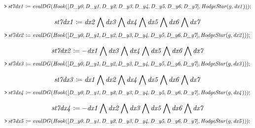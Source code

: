 \documentclass{article}
\begin{document}
\mapleinput
{$ \displaystyle \texttt{>\,} \mathit{st7dx1} \coloneqq \mathit{evalDG} (\mathit{Hook} ([\textit{D\_y0} ,\textit{D\_y1} ,\textit{D\_y2} ,\textit{D\_y3} ,\textit{D\_y4} ,\textit{D\_y5} ,\textit{D\_y6} ,\textit{D\_y7}],\mathit{HodgeStar} (g ,\mathit{dx1}))); $}

\begin{dmath}\label{(25)}
\mathit{st7dx1} \coloneqq 
\\
\mathit{dx2} \bigwedge  \mathit{dx3}  \bigwedge  \mathit{dx4}  \bigwedge  \mathit{dx5}  
\\
\bigwedge  \mathit{dx6} 
\\
 \bigwedge  \mathit{dx7} 
\end{dmath}
\mapleinput
{$ \displaystyle \texttt{>\,} \mathit{st7dx2} \coloneqq \mathit{evalDG} (\mathit{Hook} ([\textit{D\_y0} ,\textit{D\_y1} ,\textit{D\_y2} ,\textit{D\_y3} ,\textit{D\_y4} ,\textit{D\_y5} ,\textit{D\_y6} ,\textit{D\_y7}],\mathit{HodgeStar} (g ,\mathit{dx2})));\, $}

\begin{dmath}\label{(26)}
\mathit{st7dx2} \coloneqq -\mathit{dx1} \bigwedge  \mathit{dx3}  \bigwedge  \mathit{dx4}  \bigwedge  \mathit{dx5}  \bigwedge  \mathit{dx6} 
\\
 \bigwedge  \mathit{dx7} 
\end{dmath}
\mapleinput
{$ \displaystyle \texttt{>\,} \mathit{st7dx3} \coloneqq \mathit{evalDG} (\mathit{Hook} ([\textit{D\_y0} ,\textit{D\_y1} ,\textit{D\_y2} ,\textit{D\_y3} ,\textit{D\_y4} ,\textit{D\_y5} ,\textit{D\_y6} ,\textit{D\_y7}],\mathit{HodgeStar} (g ,\mathit{dx3})));\, $}

\begin{dmath}\label{(27)}
\mathit{st7dx3} \coloneqq 
\\
\mathit{dx1} \bigwedge  \mathit{dx2}  \bigwedge  \mathit{dx4}  \bigwedge  \mathit{dx5}  
\\
\bigwedge  \mathit{dx6} 
\\
 \bigwedge  \mathit{dx7} 
\end{dmath}
\mapleinput
{$ \displaystyle \texttt{>\,} \mathit{st7dx4} \coloneqq \mathit{evalDG} (\mathit{Hook} ([\textit{D\_y0} ,\textit{D\_y1} ,\textit{D\_y2} ,\textit{D\_y3} ,\textit{D\_y4} ,\textit{D\_y5} ,\textit{D\_y6} ,\textit{D\_y7}],\mathit{HodgeStar} (g ,\mathit{dx4})));\, $}

\begin{dmath}\label{(28)}
\mathit{st7dx4} \coloneqq -\mathit{dx1} \bigwedge  \mathit{dx2}  \bigwedge  \mathit{dx3}  \bigwedge  \mathit{dx5}  \bigwedge  \mathit{dx6} 
\\
 \bigwedge  \mathit{dx7} 
\end{dmath}
\mapleinput
{$ \displaystyle \texttt{>\,} \mathit{st7dx5} \coloneqq \mathit{evalDG} (\mathit{Hook} ([\textit{D\_y0} ,\textit{D\_y1} ,\textit{D\_y2} ,\textit{D\_y3} ,\textit{D\_y4} ,\textit{D\_y5} ,\textit{D\_y6} ,\textit{D\_y7}],\mathit{HodgeStar} (g ,\mathit{dx5})));\, $}
\end{document}
